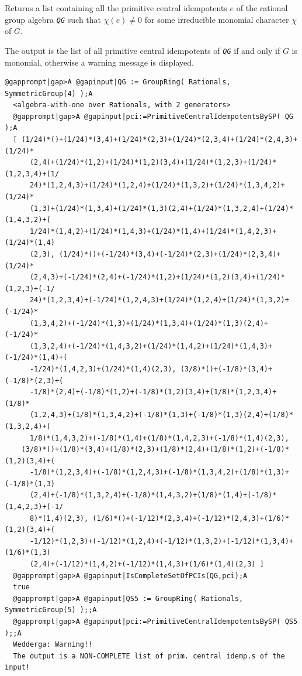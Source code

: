 \documentclass[a4paper,11pt]{report}
\begin{document}
{{{ Returns a list containing all the primitive central idempotents $e$ of the rational group algebra \mbox{\texttt{\mdseries\slshape QG}} such that $\chi(e)\ne 0$ for some irreducible monomial character $\chi$ of $G$. 

 The output is the list of all primitive central idempotents of \mbox{\texttt{\mdseries\slshape QG}} if and only if $G$ is monomial, otherwise a warning message is displayed. 
\begin{Verbatim}[commandchars=@|A,fontsize=\small,frame=single,label=Example]
  @gapprompt|gap>A @gapinput|QG := GroupRing( Rationals, SymmetricGroup(4) );A
  <algebra-with-one over Rationals, with 2 generators>
  @gapprompt|gap>A @gapinput|pci:=PrimitiveCentralIdempotentsBySP( QG );A
  [ (1/24)*()+(1/24)*(3,4)+(1/24)*(2,3)+(1/24)*(2,3,4)+(1/24)*(2,4,3)+(1/24)*
      (2,4)+(1/24)*(1,2)+(1/24)*(1,2)(3,4)+(1/24)*(1,2,3)+(1/24)*(1,2,3,4)+(1/
      24)*(1,2,4,3)+(1/24)*(1,2,4)+(1/24)*(1,3,2)+(1/24)*(1,3,4,2)+(1/24)*
      (1,3)+(1/24)*(1,3,4)+(1/24)*(1,3)(2,4)+(1/24)*(1,3,2,4)+(1/24)*(1,4,3,2)+(
      1/24)*(1,4,2)+(1/24)*(1,4,3)+(1/24)*(1,4)+(1/24)*(1,4,2,3)+(1/24)*(1,4)
      (2,3), (1/24)*()+(-1/24)*(3,4)+(-1/24)*(2,3)+(1/24)*(2,3,4)+(1/24)*
      (2,4,3)+(-1/24)*(2,4)+(-1/24)*(1,2)+(1/24)*(1,2)(3,4)+(1/24)*(1,2,3)+(-1/
      24)*(1,2,3,4)+(-1/24)*(1,2,4,3)+(1/24)*(1,2,4)+(1/24)*(1,3,2)+(-1/24)*
      (1,3,4,2)+(-1/24)*(1,3)+(1/24)*(1,3,4)+(1/24)*(1,3)(2,4)+(-1/24)*
      (1,3,2,4)+(-1/24)*(1,4,3,2)+(1/24)*(1,4,2)+(1/24)*(1,4,3)+(-1/24)*(1,4)+(
      -1/24)*(1,4,2,3)+(1/24)*(1,4)(2,3), (3/8)*()+(-1/8)*(3,4)+(-1/8)*(2,3)+(
      -1/8)*(2,4)+(-1/8)*(1,2)+(-1/8)*(1,2)(3,4)+(1/8)*(1,2,3,4)+(1/8)*
      (1,2,4,3)+(1/8)*(1,3,4,2)+(-1/8)*(1,3)+(-1/8)*(1,3)(2,4)+(1/8)*(1,3,2,4)+(
      1/8)*(1,4,3,2)+(-1/8)*(1,4)+(1/8)*(1,4,2,3)+(-1/8)*(1,4)(2,3), 
    (3/8)*()+(1/8)*(3,4)+(1/8)*(2,3)+(1/8)*(2,4)+(1/8)*(1,2)+(-1/8)*(1,2)(3,4)+(
      -1/8)*(1,2,3,4)+(-1/8)*(1,2,4,3)+(-1/8)*(1,3,4,2)+(1/8)*(1,3)+(-1/8)*(1,3)
      (2,4)+(-1/8)*(1,3,2,4)+(-1/8)*(1,4,3,2)+(1/8)*(1,4)+(-1/8)*(1,4,2,3)+(-1/
      8)*(1,4)(2,3), (1/6)*()+(-1/12)*(2,3,4)+(-1/12)*(2,4,3)+(1/6)*(1,2)(3,4)+(
      -1/12)*(1,2,3)+(-1/12)*(1,2,4)+(-1/12)*(1,3,2)+(-1/12)*(1,3,4)+(1/6)*(1,3)
      (2,4)+(-1/12)*(1,4,2)+(-1/12)*(1,4,3)+(1/6)*(1,4)(2,3) ]
  @gapprompt|gap>A @gapinput|IsCompleteSetOfPCIs(QG,pci);A
  true
  @gapprompt|gap>A @gapinput|QS5 := GroupRing( Rationals, SymmetricGroup(5) );;A
  @gapprompt|gap>A @gapinput|pci:=PrimitiveCentralIdempotentsBySP( QS5 );;A
  Wedderga: Warning!!
  The output is a NON-COMPLETE list of prim. central idemp.s of the input!

\end{Verbatim}}}}
\end{document}
